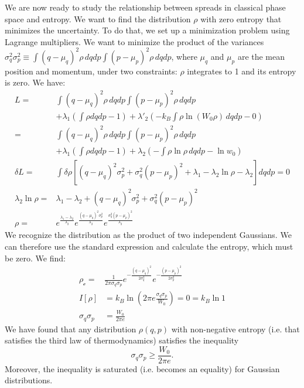 We are now ready to study the relationship between spreads in classical phase space and entropy. We want to find the distribution $\rho$ with zero entropy that minimizes the uncertainty. To do that, we set up a minimization problem using Lagrange multipliers. We want to minimize the product of the variances $\sigma_q^2 \sigma_p^2 \equiv \int (q-\mu_q)^2 \rho \, dqdp \int (p-\mu_p)^2 \rho \, dqdp$, where $\mu_q$ and $\mu_p$ are the mean position and momentum, under two constraints: $\rho$ integrates to 1 and its entropy is zero. We have: 
\begin{align*}
	L = &\int (q-\mu_q)^2 \rho \, dqdp \int (p-\mu_p)^2 \rho \, dqdp \\
	&+ \lambda_1(\int \rho dqdp - 1) + \lambda'_2(- k_B \int \rho \ln (W_0 \rho) \, dqdp - 0)\\
	= &\int (q-\mu_q)^2 \rho \, dqdp \int (p-\mu_p)^2 \rho \, dqdp \\
&+ \lambda_1(\int \rho dqdp - 1) + \lambda_2(- \int \rho \ln \rho \, dqdp - \ln w_0)\\
	\delta L = &\int \delta \rho [(q-\mu_q)^2 \sigma_p^2 + \sigma_q^2 (p-\mu_p)^2 +  \lambda_1 - \lambda_2 \ln \rho - \lambda_2 ] dqdp = 0 \\
	\lambda_2 \ln \rho = &\lambda_1 - \lambda_2 + (q-\mu_q)^2 \sigma_p^2 + \sigma_q^2 (p-\mu_p)^2 \\
	\rho = &e^{\frac{\lambda_1 - \lambda_2}{\lambda_2}}e^{\frac{(q-\mu_q)^2 \sigma_p^2}{\lambda_2}}e^{\frac{\sigma_q^2 (p-\mu_p)^2}{\lambda_2}}
\end{align*}
We recognize the distribution as the product of two independent Gaussians. We can therefore use the standard expression and calculate the entropy, which must be zero. We find:
\begin{align*}
	\rho_{\mathcal{c}} = &\frac{1}{ 2 \pi \sigma_q \sigma_p} e^{-\frac{(q-\mu_q)^2}{2\sigma_q^2}} e^{-\frac{(p-\mu_p)^2}{2\sigma_p^2}} \\
	I[\rho] &= k_B \ln \left( 2\pi e \frac{\sigma_q\sigma_p}{W_0}  \right) = 0 = k_B \ln 1  \\
	\sigma_q \sigma_p &= \frac{W_0}{2 \pi e}
\end{align*}
We have found that any distribution $\rho(q,p)$ with non-negative entropy (i.e. that satisfies the third law of thermodynamics) satisfies the inequality
\begin{equation}\label{rp-cm-classicalUncertaintyPrinciple}
	\sigma_q \sigma_p \geq \frac{W_0}{2 \pi e}.
\end{equation}
Moreover, the inequality is saturated (i.e. becomes an equality) for Gaussian distributions.

